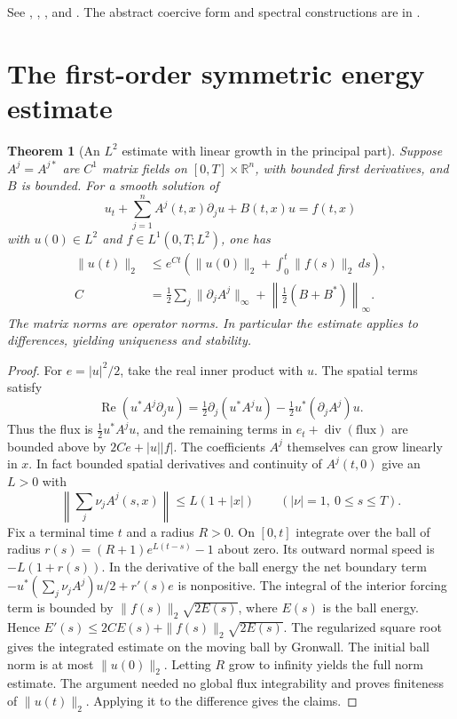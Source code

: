 \documentclass[11pt,oneside,openany]{book}
\theoremstyle{plain}
\newtheorem{theorem}{Theorem}[chapter]
\theoremstyle{definition}
\theoremstyle{remark}
\begin{document}
See \cite[Section 7.2]{Evans}, \cite[Chapter 6, Section 1]{TaylorI},
\cite[Section 10.3]{Brezis}, and \cite[Section 12.3.2]{RR}.
The abstract coercive form and spectral constructions are in
\cite{P106,D16}.

\section{The first-order symmetric energy estimate}\label{pde:W06}

\begin{theorem}[An \(L^2\) estimate with linear growth in the principal part]
\label{thm:pde-symmetric-energy}
Suppose \(A^j=A^{j*}\) are \(C^1\) matrix fields on
\([0,T]\times\mathbb R^n\), with bounded first derivatives, and
\(B\) is bounded. For a smooth solution of
\[
 u_t+\sum_{j=1}^n A^j(t,x)\partial_j u+B(t,x)u=f(t,x)
\]
with \(u(0)\in L^2\) and \(f\in L^1(0,T;L^2)\), one has
\begin{align*}
 \|u(t)\|_2&\leq e^{Ct}
          \left(\|u(0)\|_2+\int_0^t\|f(s)\|_2\,ds\right),\\
 C&=\tfrac12\sum_j\|\partial_j A^j\|_\infty+
                      \left\|\tfrac12(B+B^*)\right\|_\infty .
\end{align*}
The matrix norms are operator norms. In particular the estimate
applies to differences, yielding uniqueness and stability.
\end{theorem}

\begin{proof}
For \(e=|u|^2/2\), take the real inner product with \(u\).
The spatial terms satisfy
\[
 \operatorname{Re}(u^*A^j\partial_j u)
    =\tfrac12\partial_j(u^*A^j u)
        -\tfrac12u^*(\partial_j A^j)u .
\]
Thus the flux is \(\tfrac12u^*A^j u\), and the remaining terms in
\(e_t+\operatorname{div}(\text{flux})\) are bounded above by
\(2Ce+|u||f|\). The coefficients \(A^j\) themselves can grow
linearly in \(x\). In fact bounded spatial derivatives and
continuity of \(A^j(t,0)\) give an \(L>0\) with
\[
 \left\|\sum_j\nu_jA^j(s,x)\right\|\leq L(1+|x|)
       \qquad(|\nu|=1,\ 0\leq s\leq T).
\]
Fix a terminal time \(t\) and a radius \(R>0\). On \([0,t]\)
integrate over the ball of radius
\(r(s)=(R+1)e^{L(t-s)}-1\) about zero.
Its outward normal speed is \(-L(1+r(s))\).
In the derivative of the ball energy the net boundary term
\(-u^*(\sum_j\nu_jA^j)u/2+r'(s)e\) is nonpositive.
The integral of the interior forcing term is bounded by
\(\|f(s)\|_2\sqrt{2E(s)}\), where \(E(s)\) is the ball energy.
Hence \(E'(s)\leq 2CE(s)+\|f(s)\|_2\sqrt{2E(s)}\).
The regularized square root gives the integrated estimate on the
moving ball by Gronwall. The initial ball norm is at most
\(\|u(0)\|_2\). Letting \(R\) grow to infinity yields the full
norm estimate. The argument needed no global flux integrability
and proves finiteness of \(\|u(t)\|_2\). Applying it to the
difference gives the claims.
\end{proof}
\end{document}
